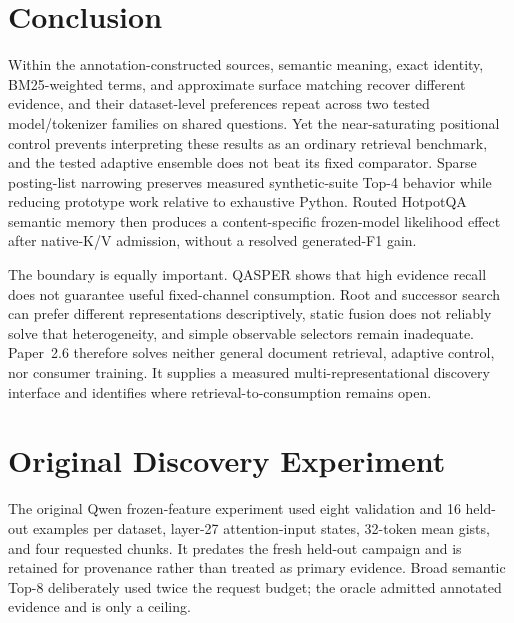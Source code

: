 \documentclass[11pt]{article}
\begin{document}
\section{Conclusion}
Within the annotation-constructed sources, semantic meaning, exact identity, BM25-weighted terms, and approximate surface matching recover different evidence, and their dataset-level preferences repeat across two tested model/tokenizer families on shared questions. Yet the near-saturating positional control prevents interpreting these results as an ordinary retrieval benchmark, and the tested adaptive ensemble does not beat its fixed comparator. Sparse posting-list narrowing preserves measured synthetic-suite Top-4 behavior while reducing prototype work relative to exhaustive Python. Routed HotpotQA semantic memory then produces a content-specific frozen-model likelihood effect after native-K/V admission, without a resolved generated-F1 gain.

The boundary is equally important. QASPER shows that high evidence recall does not guarantee useful fixed-channel consumption. Root and successor search can prefer different representations descriptively, static fusion does not reliably solve that heterogeneity, and simple observable selectors remain inadequate. Paper~2.6 therefore solves neither general document retrieval, adaptive control, nor consumer training. It supplies a measured multi-representational discovery interface and identifies where retrieval-to-consumption remains open.

\appendix
\section{Original Discovery Experiment}
\label{app:original}
The original Qwen frozen-feature experiment used eight validation and 16 held-out examples per dataset, layer-27 attention-input states, 32-token mean gists, and four requested chunks. It predates the fresh held-out campaign and is retained for provenance rather than treated as primary evidence. Broad semantic Top-8 deliberately used twice the request budget; the oracle admitted annotated evidence and is only a ceiling.
\end{document}
